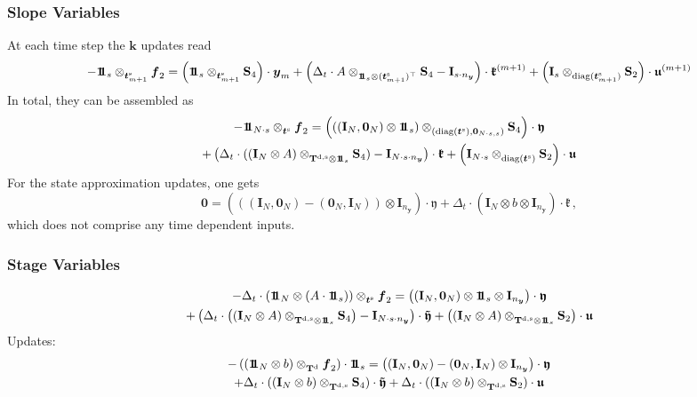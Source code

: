 \documentclass{article}
\newcommand{\tp}{\top}%
\newcommand{\kron}{\otimes}%
\newcommand{\dkron}[2][]{\mathbin{\kron_{#2}^{#1}}}%
\newcommand{\diag}{\mathop{\mathrm{diag}}}%
\newcommand{\vectorfont}[1]{\boldsymbol{#1}}%
\newcommand{\greekvectorfont}[1]{\boldsymbol{#1}}%
\newcommand{\matrixfont}[1]{\mathbf{#1}}%
\newcommand{\fvec}{\vectorfont{f}}
\newcommand{\kvec}{\vectorfont{k}}
\newcommand{\tvec}{\vectorfont{t}}
\newcommand{\yvec}{\vectorfont{y}}
\newcommand{\kfrakvec}{\vectorfont{\mathfrak{k}}}
\newcommand{\ufrakvec}{\vectorfont{\mathfrak{u}}}
\newcommand{\yfrakvec}{\vectorfont{\mathfrak{y}}}
\newcommand{\tildeyfrakvec}{\vectorfont{\tilde{\mathfrak{y}}}}
\newcommand{\nullvec}{\greekvectorfont{0}}
\newcommand{\einsvec}{\vectorfont{1}\negthinspace\negthinspace\vectorfont{1}} %
\newcommand{\Imat}{\matrixfont{I}}%
\newcommand{\Smat}{\matrixfont{S}}
\newcommand{\Tmat}{\matrixfont{T}}
\newcommand{\Nullmat}{\matrixfont{0}}
\begin{document}
\subsubsection*{Slope Variables}
At each time step the $\kvec$ updates read
\[
-\einsvec_s \dkron{\tvec_{m+1}^{\mathrm{s}}} \fvec_2
 = \left(\einsvec_s \dkron{\tvec_{m+1}^{\mathrm{s}}} \Smat_4 \right)\cdot \yvec_m +
 \left( \Delta_t \cdot A \dkron{\einsvec_s \kron (\tvec_{m+1}^{\mathrm{s}})^{\tp}} \Smat_4  - \Imat_{s \cdot n_{\yvec}}\right)\cdot \kfrakvec^{(m+1)} + \left( \Imat_s \dkron{\diag (\tvec_{m+1}^{\mathrm{s}})} \Smat_2 \right)\cdot \ufrakvec^{(m+1)}
\]
In total, they can be assembled as
\begin{multline*}
-\einsvec_{N\cdot s} \dkron{\tvec^{\mathrm{s}}} \fvec_2 
=
\left( \left( (\Imat_N, \nullvec_N) \kron \einsvec_s \right) \dkron{(\diag (\tvec^{\mathrm{s}}), \Nullmat_{N \cdot s,s})} \Smat_4 \right) \cdot \yfrakvec 
\\
+ \left(\Delta_t \cdot  ((\Imat_N \kron A) \dkron{\Tmat^{\mathrm{d}, \mathrm{s}} \kron \einsvec_s} \Smat_4)   - \Imat_{N\cdot s \cdot n_{\yvec}}\right) \cdot \kfrakvec
+ \left( \Imat_{N \cdot s} \dkron{\diag(\tvec^{\mathrm{s}})}  \Smat_2\right) \cdot \ufrakvec 
\end{multline*}
For the state approximation updates, one gets
\[
\nullvec 
=
\left(
((\Imat_N, \nullvec_N) - (\nullvec_N, \Imat_N)) \kron \Imat_{n_{\yvec}}
\right) \cdot \yfrakvec 
+ \Delta_t \cdot  (\Imat_N \kron b \kron \Imat_{n_{\yvec}}) \cdot \kfrakvec\,,
\]
which does not comprise any time dependent inputs.

\subsubsection*{Stage Variables}
\begin{multline*}
-\Delta_t \cdot \left(\einsvec_N \kron (A \cdot \einsvec_s) \right) \dkron{\tvec^{\mathrm{s}}} \fvec_2
= \left((\Imat_N,\nullvec_N) \kron \einsvec_s \kron \Imat_{n_{\yvec}}  \right) \cdot \yfrakvec
\\
+ \left(\Delta_t \cdot \left((\Imat_{N} \kron A) \dkron{\Tmat^{\mathrm{d},\mathrm{s}} \kron \einsvec_s} \Smat_4  \right)  -\Imat_{N \cdot s \cdot n_{\yvec}}\right) \cdot \tildeyfrakvec
+\left( (\Imat_N \kron A) \dkron{\Tmat^{\mathrm{d},\mathrm{s}} \kron \einsvec_s} \Smat_2 \right)\cdot \ufrakvec
\end{multline*}
Updates:
\begin{multline*}
- \left( (\einsvec_N \kron  b) \dkron{\Tmat^{\mathrm{d}}} \fvec_2 \right) \cdot \einsvec_s
=
\left((\Imat_N,\nullvec_N)-(\nullvec_N,\Imat_N)\kron \Imat_{n_{\yvec}} \right)\cdot \yfrakvec
\\
+ \Delta_t \cdot \left((\Imat_{N} \kron b)\dkron{\Tmat^{\mathrm{d},\mathrm{s}}}\Smat_4   \right)\cdot \tildeyfrakvec
+ \Delta_t \cdot \left((\Imat_{N} \kron b)\dkron{\Tmat^{\mathrm{d},\mathrm{s}}}\Smat_2 \right) \cdot \ufrakvec
\end{multline*}
\end{document}
